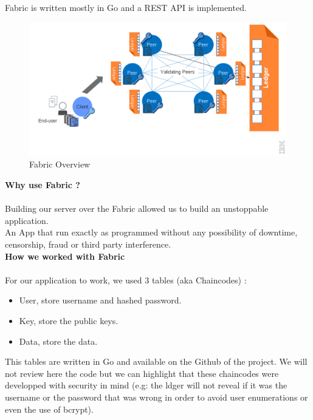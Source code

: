  			\paragraph{}
			Fabric is written mostly in Go and a REST API is implemented.
			
			 \begin{figure}[H]
	    		 \centering
	     		 \includegraphics[width=14cm]{images/Fabric/Fabric}
	     		 \caption{Fabric Overview}
	   		\end{figure}
			
			 \textbf{Why use Fabric ?}
			 \paragraph{}
			 Building our server over the Fabric allowed us to build an unstoppable application.\\An App that run exactly as programmed without any possibility of downtime, censorship, fraud or third party interference.\\
			 
			  \textbf{How we worked with Fabric}
			   \paragraph{}
			 For our application to work, we used 3 tables (aka Chaincodes) : 
 			\begin{itemize}
 			\item User, store username and hashed password.
 			\item Key, store the public keys.
 			\item Data, store the data.
 			\end{itemize}
 			This tables are written in Go and available on the Github of the project. We will not review here the code but we can highlight that these chaincodes were developped with security in mind (e.g: the ldger will not reveal if it was the username or the password that was wrong in order to avoid user enumerations or even the use of bcrypt).
